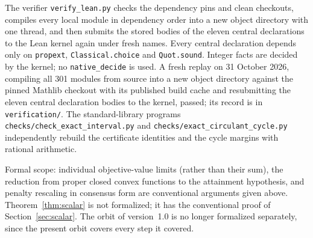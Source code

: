 \documentclass[11pt]{article}
\numberwithin{equation}{section}
\theoremstyle{definition}
\theoremstyle{remark}
\newcommand{\lean}[1]{{\urlstyle{tt}\nolinkurl{#1}}}
\newcommand{\replaystatus}{A fresh replay on 31 October 2026, compiling all 301 modules from source into a new object directory against the pinned Mathlib checkout with its published build cache and resubmitting the eleven central declaration bodies to the kernel, passed; its record is in \texttt{verification/}.}
\begin{document}
The verifier \lean{verify_lean.py} checks the dependency pins and clean checkouts, compiles every local module in dependency order into a new object directory with one thread, and then submits the stored bodies of the eleven central declarations to the Lean kernel again under fresh names. Every central declaration depends only on \texttt{propext}, \lean{Classical.choice} and \lean{Quot.sound}. Integer facts are decided by the kernel; no \lean{native_decide} is used. \replaystatus{} The standard-library programs \lean{checks/check_exact_interval.py} and \lean{checks/exact_circulant_cycle.py} independently rebuild the certificate identities and the cycle margins with rational arithmetic.

Formal scope: individual objective-value limits (rather than their sum), the reduction from proper closed convex functions to the attainment hypothesis, and penalty rescaling in consensus form are conventional arguments given above. Theorem~\ref{thm:scalar} is not formalized; it has the conventional proof of Section~\ref{sec:scalar}. The orbit of version~1.0 is no longer formalized separately, since the present orbit covers every step it covered.
\end{document}
